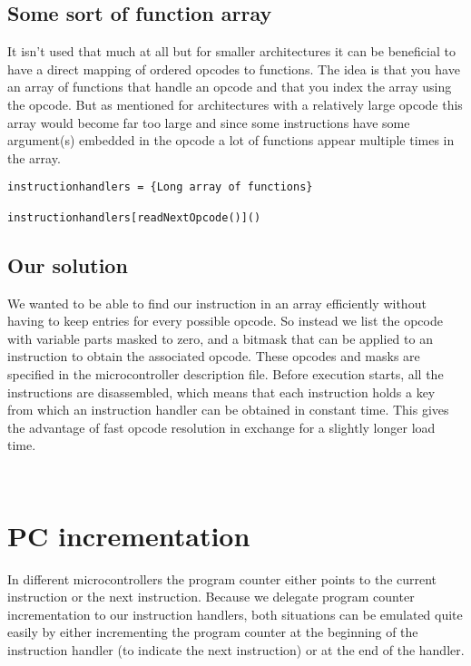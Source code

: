 \subsection{Some sort of function array}
It isn't used that much at all but for smaller architectures it can be beneficial 
to have a direct mapping of ordered opcodes to functions. The idea is that 
you have an array of functions that handle an
opcode and that you index the array using the opcode. But as mentioned
for architectures with a relatively large opcode this array would
become far too large and since some instructions have some argument(s)
embedded in the opcode a lot of functions appear multiple times in the array.

\lstset{caption=Example opcode parsing using a function array}
\begin{lstlisting}
instructionhandlers = {Long array of functions}

instructionhandlers[readNextOpcode()]()

\end{lstlisting}

\subsection{Our solution}
We wanted to be able to find our instruction in an array efficiently without
having to keep entries for every possible opcode. So instead we list the
opcode with variable parts masked to zero, and a bitmask that can be applied
to an instruction to obtain the associated opcode. These opcodes and masks are
specified in the microcontroller description file. Before execution starts,
all the instructions are disassembled, which means that each instruction holds
a key from which an instruction handler can be obtained in constant time. This gives the advantage of fast opcode resolution in exchange for a slightly longer load time. 

\lstset{caption=An example of our opcode parsing solution}
\begin{lstlisting}


\end{lstlisting}


\section[PC incrementation]{PC incrementation}
In different microcontrollers the program counter either points to the
current instruction or the next instruction. Because we delegate
program counter incrementation to our instruction handlers, both
situations can be emulated quite easily by either incrementing the
program counter at the beginning of the instruction handler (to
indicate the next instruction) or at the end of the handler.

